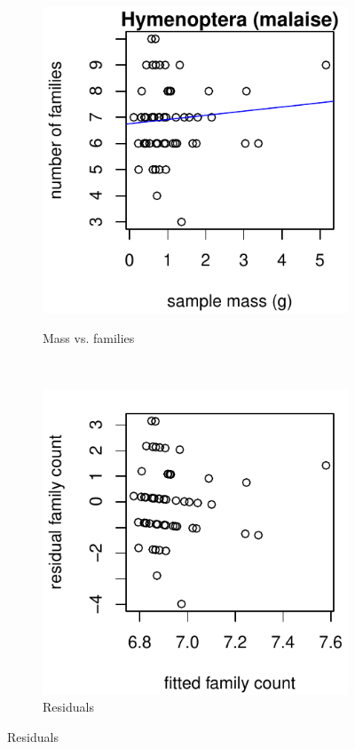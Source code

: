 \documentclass[10pt,letterpaper,twocolumn]{article}
\begin{document}
\begin{figure}[h]
	\centering
	\begin{subfigure}[b]{0.15\textwidth}
		\caption{Mass vs. families}
		\includegraphics[width=\textwidth]{plots/mass-vs-count/scatter/2015_malaise_Hymenoptera_mass-vs-count.pdf}
		\label{fig:malaise_hymenoptera_scatter}
	\end{subfigure}
	~
	\begin{subfigure}[b]{0.15\textwidth}
		\caption{Residuals}
		\includegraphics[width=\textwidth]{plots/mass-vs-count/residual/2015_malaise_Hymenoptera_residual.pdf}

\end{subfigure}
\end{figure}
\end{document}
